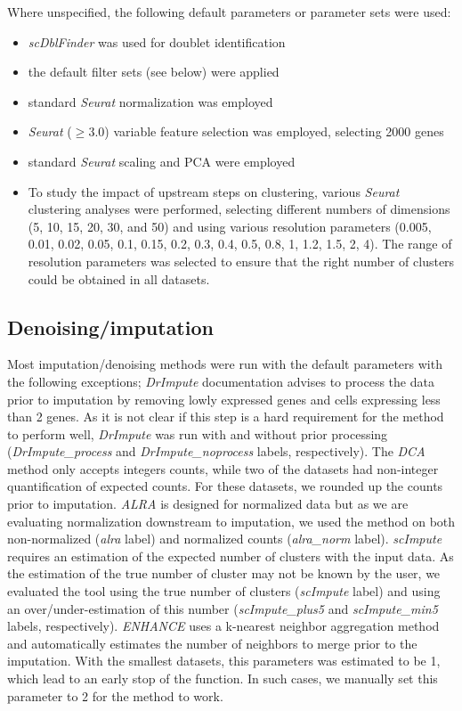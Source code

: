 \documentclass[11pt]{article}
\begin{document}
Where unspecified, the following default parameters or parameter sets were used:
\begin{itemize}
    \item \textit{scDblFinder} was used for doublet identification
    \item the default filter sets (see below) were applied
    \item standard \textit{Seurat} normalization was employed
    \item \textit{Seurat} ($\geq$3.0) variable feature selection was employed, selecting 2000 genes
    \item standard \textit{Seurat} scaling and PCA were employed
    \item To study the impact of upstream steps on clustering, various \textit{Seurat} clustering analyses were performed, selecting different numbers of dimensions (5, 10, 15, 20, 30, and 50) and using various resolution parameters (0.005, 0.01, 0.02, 0.05, 0.1, 0.15, 0.2, 0.3, 0.4, 0.5, 0.8, 1, 1.2, 1.5, 2, 4). The range of resolution parameters was selected to ensure that the right number of clusters could be obtained in all datasets.
\end{itemize}

\subsection*{Denoising/imputation}
Most imputation/denoising methods were run with the default parameters with the following exceptions; \textit{DrImpute} documentation advises to process the data prior to imputation by removing lowly expressed genes and cells expressing less than 2 genes. As it is not clear if this step is a hard requirement for the method to perform well, \textit{DrImpute} was run with and without prior processing (\textit{DrImpute\_process} and \textit{DrImpute\_noprocess} labels, respectively). The \textit{DCA} method only accepts integers counts, while two of the datasets had non-integer quantification of expected counts. For these datasets, we rounded up the counts prior to imputation. \textit{ALRA} is designed for normalized data but as we are evaluating normalization downstream to imputation, we used the method on both non-normalized (\textit{alra} label) and normalized counts (\textit{alra\_norm} label). \textit{scImpute} requires an estimation of the expected number of clusters with the input data. As the estimation of the true number of cluster may not be known by the user, we evaluated the tool using the true number of clusters (\textit{scImpute} label) and using an over/under-estimation of this number (\textit{scImpute\_plus5} and \textit{scImpute\_min5} labels, respectively). \textit{ENHANCE} uses a k-nearest neighbor aggregation method and automatically estimates the number of neighbors to merge prior to the imputation. With the smallest datasets, this parameters was estimated to be 1, which lead to an early stop of the function. In such cases, we manually set this parameter to 2 for the method to work. 
\end{document}

